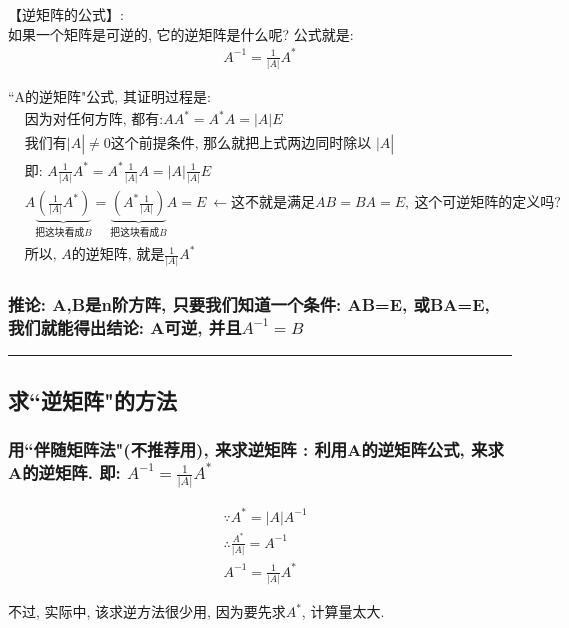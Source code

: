 \documentclass[UTF8]{ctexart}
\begin{document}
【逆矩阵的公式】: \\
如果一个矩阵是可逆的, 它的逆矩阵是什么呢? 公式就是: 
\begin{align*}
	\boxed{
			A^{-1}=\frac{1}{|A|}A^*
	}
\end{align*}


\begin{myEnvSample}
``A的逆矩阵"公式, 其证明过程是: 
\begin{align*}
	&\text{因为对任何方阵,\ 都有:} AA^*=A^*A=|A|E\  \\
&\text{我们有|}A|\ne 0\text{这个前提条件,\ 那么就把}\text{上式两边同时除以\ |}A|\\
&\text{即:\ }A\frac{1}{|A|}A^*=A^*\frac{1}{|A|}A=|A|\frac{1}{|A|}E\\
&A\underset{\text{把这块看成}B}{\underbrace{\left( \frac{1}{|A|}A^* \right) }}=\underset{\text{把这块看成}B}{\underbrace{\left( A^*\frac{1}{|A|} \right) }}A=E\ ←\text{这不就是满足}AB=BA=E,\ \text{这个可逆矩阵的定义吗?}\\
&\text{所以,\ }A\text{的逆矩阵,\ 就是}\frac{1}{|A|}A^*
\end{align*}
\end{myEnvSample}


\subsubsection{推论: A,B是n阶方阵, 只要我们知道一个条件: AB=E, 或BA=E, 我们就能得出结论: A可逆, 并且$A^{-1}=B$ }



\hrule


\subsection{求``逆矩阵"的方法}


\subsubsection{用``伴随矩阵法"(不推荐用), 来求逆矩阵 : 利用A的逆矩阵公式, 来求A的逆矩阵. 即:  $	A^{-1}=\frac{1}{|A|}A^*	$ }

\begin{align*}
	& \because A^{\ast} = |A| A^{-1} \\
	& \therefore \frac{A^{\ast}}{|A| } = A^{-1} \\
	&
	\boxed{
		A^{-1}  =  \frac{1}{|A| } A^{\ast}
	}
\end{align*}

不过, 实际中, 该求逆方法很少用, 因为要先求$A^*$, 计算量太大. \\
\end{document}
